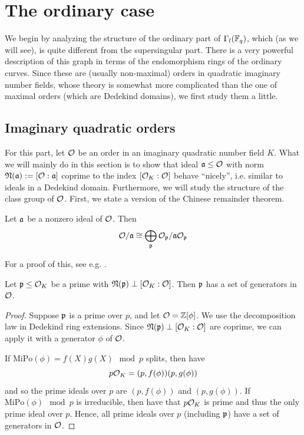 \section{The ordinary case}
We begin by analyzing the structure of the ordinary part of $\Gamma_l(\mathbb{F}_q)$, which (as we will see), is quite different from the supersingular part.
There is a very powerful description of this graph in terms of the endomorphism rings of the ordinary curves.
Since these are (usually non-maximal) orders in quadratic imaginary number fields, whose theory is somewhat more complicated than the one of maximal orders (which are Dedekind domains), we first study them a little.

\subsection{Imaginary quadratic orders}
For this part, let $\mathcal{O}$ be an order in an imaginary quadratic number field $K$.
What we will mainly do in this section is to show that ideal $\mathfrak{a} \leq \mathcal{O}$ with norm $\mathfrak{N}(\mathfrak{a}) := [\mathcal{O} : \mathfrak{a}]$ coprime to the index $[\mathcal{O}_K : \mathcal{O}]$ behave ``nicely'', i.e. similar to ideals in a Dedekind domain.
Furthermore, we will study the structure of the class group of $\mathcal{O}$.
First, we state a version of the Chinese remainder theorem.
\begin{lemma}
    Let $\mathfrak{a}$ be a nonzero ideal of $\mathcal{O}$. Then
    \begin{equation*}
        \mathcal{O}/\mathfrak{a} \cong \bigoplus_{\mathfrak{p}} \mathcal{O}_{\mathfrak{p}}/\mathfrak{a}\mathcal{O}_{\mathfrak{p}}
    \end{equation*}
\end{lemma}
For a proof of this, see e.g. \cite[Prop.~I.12.3]{neukirch}.
\begin{lemma}
    Let $\mathfrak{p} \leq \mathcal{O}_K$ be a prime with $\mathfrak{N}(\mathfrak{p}) \perp [\mathcal{O}_K : \mathcal{O}]$.
    Then $\mathfrak{p}$ has a set of generators in $\mathcal{O}$.
\end{lemma}
\begin{proof}
    Suppose $\mathfrak{p}$ is a prime over $p$, and let $\mathcal{O} = \mathbb{Z}[\phi]$.
    We use the decomposition law in Dedekind ring extensions.
    Since $\mathfrak{N}(\mathfrak{p}) \perp [\mathcal{O}_K : \mathcal{O}]$ are coprime, we can apply it with a generator $\phi$ of $\mathcal{O}$.

    If $\mathrm{MiPo}(\phi) = f(X)g(X) \mod p$ splits, then have
    \begin{equation*}
        p\mathcal{O}_K = (p, f(\phi))(p, g(\phi))
    \end{equation*}
    and so the prime ideals over $p$ are $(p, f(\phi))$ and $(p, g(\phi))$.
    If $\mathrm{MiPo}(\phi) \mod p$ is irreducible, then have that $p\mathcal{O}_K$ is prime and thus the only prime ideal over $p$.
    Hence, all prime ideals over $p$ (including $\mathfrak{p}$) have a set of generators in $\mathcal{O}$.
\end{proof}
